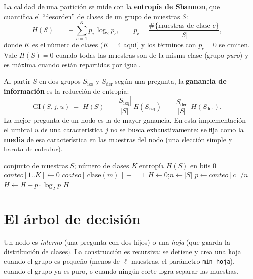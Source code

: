 \documentclass[11pt,a4paper]{article}
\begin{document}
La calidad de una partición se mide con la \textbf{entropía de Shannon}, que cuantifica el
``desorden'' de clases de un grupo de muestras $S$:
\[
  H(S) \;=\; -\sum_{c=1}^{K} p_c \,\log_2 p_c ,
  \qquad p_c = \frac{\#\{\text{muestras de clase } c\}}{|S|},
\]
donde $K$ es el número de clases ($K=4$ aquí) y los términos con $p_c = 0$ se omiten. Vale
$H(S)=0$ cuando todas las muestras son de la misma clase (grupo \emph{puro}) y es máxima cuando
están repartidas por igual.

Al partir $S$ en dos grupos $S_{\text{izq}}$ y $S_{\text{der}}$ según una pregunta, la
\textbf{ganancia de información} es la reducción de entropía:
\[
  \mathrm{GI}(S, j, u) \;=\; H(S)
  \;-\; \frac{|S_{\text{izq}}|}{|S|}\,H(S_{\text{izq}})
  \;-\; \frac{|S_{\text{der}}|}{|S|}\,H(S_{\text{der}}).
\]
La mejor pregunta de un nodo es la de mayor ganancia. En esta implementación el umbral $u$ de
una característica $j$ no se busca exhaustivamente: se fija como la \textbf{media} de esa
característica en las muestras del nodo (una elección simple y barata de calcular).

\begin{algorithm}[h]
\caption{Entropía de un grupo de muestras}
\begin{algorithmic}[1]
  \Require conjunto de muestras $S$; número de clases $K$
  \Ensure entropía $H(S)$ en bits
   \Return $0$ \EndIf
  \State $\mathit{conteo}[1..K] \gets 0$
     \State $\mathit{conteo}[\,\text{clase}(m)\,] \mathrel{+}= 1$
  \EndFor
  \State $H \gets 0$;\quad $n \gets |S|$
        \State $p \gets \mathit{conteo}[c] / n$
        \State $H \gets H - p \cdot \log_2 p$
     \EndIf
  \EndFor
  \State \Return $H$
\EndFunction
\end{algorithmic}
\end{algorithm}

\section{El árbol de decisión}

Un nodo es \emph{interno} (una pregunta con dos hijos) o una \emph{hoja} (que guarda la
distribución de clases). La construcción es recursiva: se detiene y crea una hoja cuando el
grupo es pequeño (menos de $\ell$ muestras, el parámetro \texttt{min\_hoja}), cuando el grupo ya
es puro, o cuando ningún corte logra separar las muestras.
\end{document}
